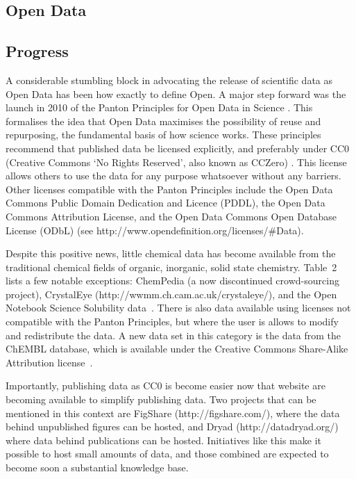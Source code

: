 \documentclass[10pt]{bmc_article}
\newenvironment{bmcformat}{\begin{raggedright}\baselineskip20pt\sloppy\setboolean{publ}{false}}{\end{raggedright}\baselineskip20pt\sloppy}
\begin{document}
\begin{bmcformat}
\section*{Open Data}
  \subsection*{Progress}

A considerable stumbling block in advocating the release of scientific
data as Open Data has been how exactly to define Open. A major step
forward was the launch in 2010 of the Panton Principles for Open Data
in Science \cite{WebPanton}. This formalises the idea that Open Data maximises the
possibility of reuse and repurposing, the fundamental basis
of how science works. These principles recommend that published data
be licensed explicitly, and preferably under CC0 (Creative Commons `No
Rights Reserved', also known as CCZero) \cite{WebCC0}. This license allows others to use the
data for any purpose whatsoever without any barriers. Other licenses
compatible with the Panton Principles include the
Open Data Commons Public Domain Dedication and Licence (PDDL), the
Open Data Commons Attribution License, and the
Open Data Commons Open Database License (ODbL) (see
http://www.opendefinition.org/licenses/\#Data).

Despite this positive news, little chemical data has become
available from the traditional chemical fields of organic,
inorganic, solid state chemistry. Table~2 lists a few notable
exceptions: ChemPedia (a now discontinued crowd-sourcing project),
CrystalEye (http://wwmm.ch.cam.ac.uk/crystaleye/),
and the Open Notebook Science Solubility
data~\cite{ONS2010}. There is also data available using licenses
not compatible with the Panton Principles, but where the user
is allows to modify and redistribute the data. A new data
set in this category is the data from the ChEMBL database,
which is available under the Creative Commons Share-Alike
Attribution license~\cite{Overington2009}.

Importantly, publishing data as CC0 is become easier now that
website are becoming available to simplify publishing data. Two
projects that can be mentioned in this context are FigShare
(http://figshare.com/), where the data behind unpublished figures
can be hosted, and Dryad (http://datadryad.org/) where data
behind publications can be hosted. Initiatives like this make
it possible to host small amounts of data, and those combined
are expected to become soon a substantial knowledge base.


\end{bmcformat}
\end{document}
